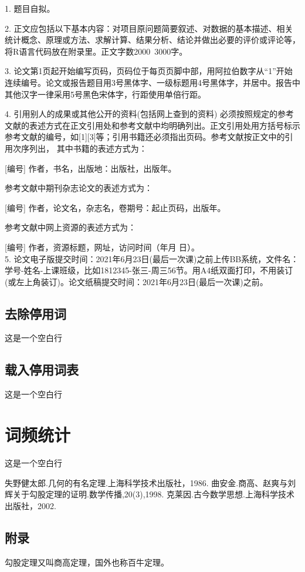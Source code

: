 \documentclass[a4paper]{ctexart}     %
\begin{document}
	1.	题目自拟。
	
	2.	正文应包括以下基本内容：对项目原问题简要叙述、对数据的基本描述、相关统计概念、原理或方法、求解计算、结果分析、结论并做出必要的评价或评论等，将R语言代码放在附录里。正文字数2000~3000字。
	
	3. 论文第1页起开始编写页码，页码位于每页页脚中部，用阿拉伯数字从“1”开始连续编号。论文或报告题目用3号黑体字、一级标题用4号黑体字，并居中。报告中其他汉字一律采用5号黑色宋体字，行距使用单倍行距。
	
	4.	引用别人的成果或其他公开的资料(包括网上查到的资料) 必须按照规定的参考文献的表述方式在正文引用处和参考文献中均明确列出。正文引用处用方括号标示参考文献的编号，如[1][3]等；引用书籍还必须指出页码。参考文献按正文中的引用次序列出，
	其中书籍的表述方式为：  
	
	[编号] 作者，书名，出版地：出版社，出版年。
	
	参考文献中期刊杂志论文的表述方式为：
	
	[编号] 作者，论文名，杂志名，卷期号：起止页码，出版年。
	
	参考文献中网上资源的表述方式为：
	
	[编号] 作者，资源标题，网址，访问时间（年月 日）。\\
	5.	论文电子版提交时间：2021年6月23日(最后一次课)之前上传BB系统，文件名：学号-姓名-上课班级，比如1812345-张三-周三56节。用A4纸双面打印，不用装订(或左上角装订)。论文纸稿提交时间：2021年6月23日(最后一次课)之前。\\
	
	
	\subsection{去除停用词}

	
	这是一个空白行
	
	\subsection{载入停用词表}
	这是一个空白行
	
	\section{词频统计}
	这是一个空白行


	\begin{thebibliography}{99}    %
	失野健太郎.几何的有名定理.上海科学技术出版社，1986.      
	曲安金.商高、赵爽与刘辉关于勾股定理的证明.数学传播,20(3),1998.  
	克莱因.古今数学思想.上海科学技术出版社，2002.
	\end{thebibliography}

	
	\begin{appendix}
		
		\section{附录}
		\small 勾股定理又叫商高定理，国外也称百牛定理。
		
	\end{appendix}
\end{document}

